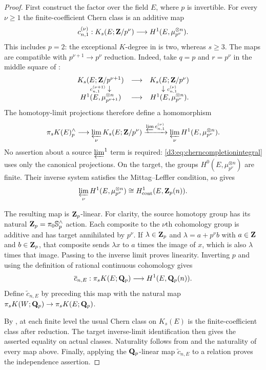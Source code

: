 \begin{proof}
First construct the factor over the field $E$, where $p$ is invertible.
For every $\nu\geq1$ the finite-coefficient Chern class is an
additive map
\[
 c^{(\nu)}_{n,1}:K_s(E;\mathbf Z/p^\nu)
       \longrightarrow H^1(E,\mu_{p^\nu}^{\otimes n}).
\]
This includes $p=2$: the exceptional $K$-degree in
\cite[Proposition~2.4, p.~10]{WeibelChern} is two, whereas $s\geq3$.
The maps are compatible with $p^{\nu+1}\to p^\nu$ reduction.
Indeed, take $q=p$ and $r=p^\nu$ in the middle square of
\cite[Proposition~2.8, p.~12]{WeibelChern}:
\[
\begin{array}{ccc}
 K_s(E;\mathbf Z/p^{\nu+1})&\longrightarrow&K_s(E;\mathbf Z/p^\nu)\\
 {\scriptstyle c^{(\nu+1)}_{n,1}}\downarrow&&
             \downarrow{\scriptstyle c^{(\nu)}_{n,1}}\\
 H^1(E,\mu_{p^{\nu+1}}^{\otimes n})&\longrightarrow&
                         H^1(E,\mu_{p^\nu}^{\otimes n}).
\end{array}
\]
The homotopy-limit projections therefore define a homomorphism
\begin{equation}\label{d3:eq:cherncompletionintegral}
 \pi_sK(E)^{\wedge}_p
 \longrightarrow\varprojlim_{\nu} K_s(E;\mathbf Z/p^\nu)
 \xrightarrow{\varprojlim c^{(\nu)}_{n,1}}
 \varprojlim_{\nu}H^1(E,\mu_{p^\nu}^{\otimes n}).
\end{equation}
No assertion about a source $\varprojlim^{1}$ term is required:
\eqref{d3:eq:cherncompletionintegral} uses only the canonical projections.
On the target, the groups $H^0(E,\mu_{p^\nu}^{\otimes n})$ are
finite. Their inverse system satisfies the Mittag--Leffler condition,
so \cite[equation~(0.2), p.~208]{Jannsen} gives
\[
 \varprojlim_{\nu}H^1(E,\mu_{p^\nu}^{\otimes n})
       \cong H^1_{\mathrm{cont}}(E,\mathbf Z_p(n)).
\]

The resulting map is $\mathbf Z_p$-linear. For clarity, the source homotopy
group has its natural $\mathbf Z_p=\pi_0\mathbb S^{\wedge}_p$ action.
Each composite to the $\nu$th cohomology group is additive and has
target annihilated by $p^\nu$. If $\lambda\in\mathbf Z_p$ and
$\lambda=a+p^\nu b$ with $a\in\mathbf Z$ and $b\in\mathbf Z_p$, that composite
sends $\lambda x$ to $a$ times the image of $x$, which is also
$\lambda$ times that image. Passing to the inverse limit proves
linearity. Inverting $p$ and using the definition of rational
continuous cohomology \cite[equation~(0.4)]{Jannsen} gives
\[
 \overline c_{n,E}:\pi_sK(E;\mathbf Q_p)
                 \longrightarrow H^1(E,\mathbf Q_p(n)).
\]
Define $\widetilde c_{n,E}$ by preceding this map with the natural
map $\pi_sK(W;\mathbf Q_p)\to\pi_sK(E;\mathbf Q_p)$.

By \cite[Lemma~2.3, p.~10]{WeibelChern}, at each finite level the
usual Chern class on $K_s(E)$ is the finite-coefficient class after
reduction. The target inverse-limit identification then gives the
asserted equality on actual classes. Naturality follows from
\cite[Proposition~2.1.1]{WeibelChern} and the naturality of every
map above. Finally, applying the $\mathbf Q_p$-linear map
$\widetilde c_{n,E}$ to a relation proves the independence assertion.
\end{proof}

